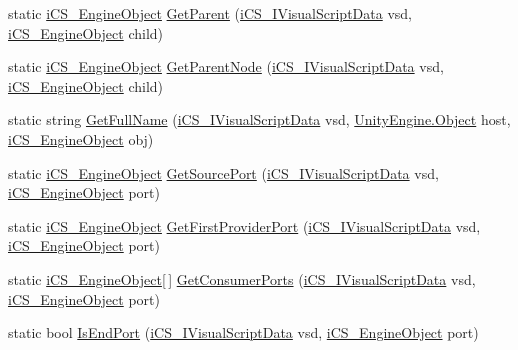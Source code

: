 \begin{DoxyCompactItemize}
\item 
static \hyperlink{classi_c_s___engine_object}{i\+C\+S\+\_\+\+Engine\+Object} \hyperlink{classi_c_s___visual_script_data_a05974899096d6472cc972ad43d5822a3}{Get\+Parent} (\hyperlink{interfacei_c_s___i_visual_script_data}{i\+C\+S\+\_\+\+I\+Visual\+Script\+Data} vsd, \hyperlink{classi_c_s___engine_object}{i\+C\+S\+\_\+\+Engine\+Object} child)
\item 
static \hyperlink{classi_c_s___engine_object}{i\+C\+S\+\_\+\+Engine\+Object} \hyperlink{classi_c_s___visual_script_data_a8352466d3e13a92433b1f1c66163a925}{Get\+Parent\+Node} (\hyperlink{interfacei_c_s___i_visual_script_data}{i\+C\+S\+\_\+\+I\+Visual\+Script\+Data} vsd, \hyperlink{classi_c_s___engine_object}{i\+C\+S\+\_\+\+Engine\+Object} child)
\item 
static string \hyperlink{classi_c_s___visual_script_data_af190a90b9d72acb55d08fc28ddd3f036}{Get\+Full\+Name} (\hyperlink{interfacei_c_s___i_visual_script_data}{i\+C\+S\+\_\+\+I\+Visual\+Script\+Data} vsd, \hyperlink{i_c_s___logic_8cs_a5b2c8b05b9a357906d7f9e5b2c1e154d}{Unity\+Engine.\+Object} host, \hyperlink{classi_c_s___engine_object}{i\+C\+S\+\_\+\+Engine\+Object} obj)
\item 
static \hyperlink{classi_c_s___engine_object}{i\+C\+S\+\_\+\+Engine\+Object} \hyperlink{classi_c_s___visual_script_data_a896f1e1809c13a4e10a0560c509d13b8}{Get\+Source\+Port} (\hyperlink{interfacei_c_s___i_visual_script_data}{i\+C\+S\+\_\+\+I\+Visual\+Script\+Data} vsd, \hyperlink{classi_c_s___engine_object}{i\+C\+S\+\_\+\+Engine\+Object} port)
\item 
static \hyperlink{classi_c_s___engine_object}{i\+C\+S\+\_\+\+Engine\+Object} \hyperlink{classi_c_s___visual_script_data_ad266b52b126cee51112a36ca2bf40d0b}{Get\+First\+Provider\+Port} (\hyperlink{interfacei_c_s___i_visual_script_data}{i\+C\+S\+\_\+\+I\+Visual\+Script\+Data} vsd, \hyperlink{classi_c_s___engine_object}{i\+C\+S\+\_\+\+Engine\+Object} port)
\item 
static \hyperlink{classi_c_s___engine_object}{i\+C\+S\+\_\+\+Engine\+Object}\mbox{[}$\,$\mbox{]} \hyperlink{classi_c_s___visual_script_data_a150ce2eedee808f213f18dae9efa378a}{Get\+Consumer\+Ports} (\hyperlink{interfacei_c_s___i_visual_script_data}{i\+C\+S\+\_\+\+I\+Visual\+Script\+Data} vsd, \hyperlink{classi_c_s___engine_object}{i\+C\+S\+\_\+\+Engine\+Object} port)
\item 
static bool \hyperlink{classi_c_s___visual_script_data_a7dc43da11b3935ba96f42b7dfb58816b}{Is\+End\+Port} (\hyperlink{interfacei_c_s___i_visual_script_data}{i\+C\+S\+\_\+\+I\+Visual\+Script\+Data} vsd, \hyperlink{classi_c_s___engine_object}{i\+C\+S\+\_\+\+Engine\+Object} port)

\end{DoxyCompactItemize}
